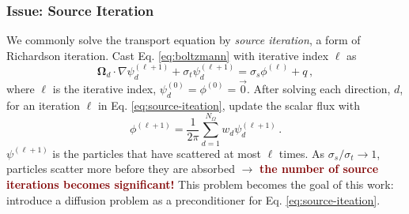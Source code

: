 \documentclass[xcolor={usenames,dvipsnames,svgnames,table}]{beamer}
\newcommand{\vo}{\pmb{\Omega}} %
\begin{document}
\begin{frame}\frametitle{Issue: Source Iteration}
	We commonly solve the transport equation by \textit{source iteration}, a form of Richardson iteration. Cast Eq. \eqref{eq:boltzmann} with iterative index $\ell$ as
	\begin{equation}
		\label{eq:source-iteation}
		\vo_d \cdot \nabla \psi_d^{(\ell + 1)} + \sigma_t \psi_d^{(\ell + 1)} = \sigma_s \phi^{(\ell)} + q\,,
	\end{equation}
	where $\ell$ is the iterative index, $\psi_d^{(0)} = \phi^{(0)} = \vec{0}$. After solving each direction, $d$, for an iteration $\ell$ in Eq. \eqref{eq:source-iteation}, update the scalar flux with
	\[
		\phi^{(\ell + 1)} = \frac{1}{2\pi} \sum_{d = 1}^{N_\Omega} w_d \psi_d^{(\ell + 1)}\,.
	\]
	$\psi^{(\ell + 1)}$ is the particles that have scattered at most $\ell$ times. As $\sigma_s / \sigma_t \to 1$, particles scatter more before they are absorbed $\rightarrow$ \textbf{\textcolor{Maroon}{the number of source iterations becomes significant!}} This problem becomes the goal of this work: introduce a diffusion problem as a preconditioner for Eq. \eqref{eq:source-iteation}.
\end{frame}

\end{document}

